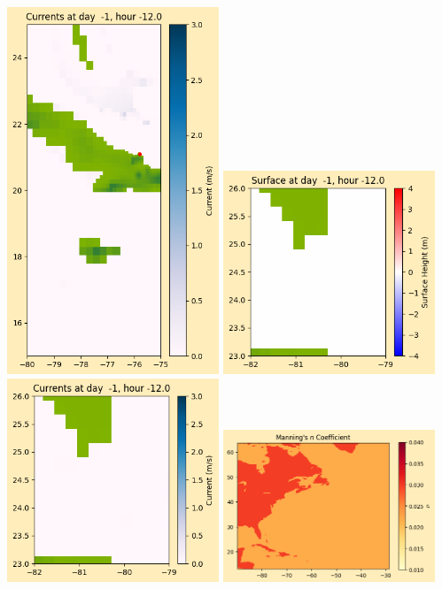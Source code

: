 \documentclass[11pt]{article}
\begin{document}
\includegraphics[width=0.475\textwidth]{frame0006fig1008.png}
\vskip 10pt 
\includegraphics[width=0.475\textwidth]{frame0006fig1009.png}
\includegraphics[width=0.475\textwidth]{frame0006fig1010.png}
\vskip 10pt 
\includegraphics[width=0.475\textwidth]{frame0006fig1011.png}
\end{document}
